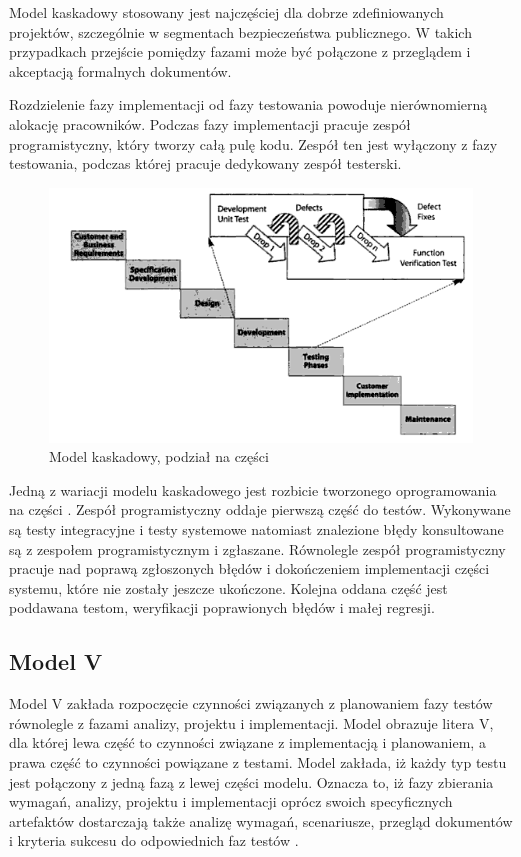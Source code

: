 Model kaskadowy stosowany jest najczęściej dla dobrze zdefiniowanych projektów, szczególnie w segmentach bezpieczeństwa publicznego. W takich przypadkach przejście pomiędzy fazami może być połączone z przeglądem i akceptacją formalnych dokumentów.

Rozdzielenie fazy implementacji od fazy testowania powoduje nierównomierną alokację pracowników. Podczas fazy implementacji pracuje zespół programistyczny, który tworzy całą pulę kodu. Zespół ten jest wyłączony z fazy testowania, podczas której pracuje dedykowany zespół testerski.
\begin{figure}[h]
\centerline{\includegraphics[scale=0.5]{img/water-wheel.png}}
\caption{Model kaskadowy, podział na części  \cite{TestingMatt}}
\label{fig:kaskadowyCzesci}
\end{figure}

Jedną z wariacji modelu kaskadowego jest rozbicie tworzonego oprogramowania na części \cite{TestingMatt}. 
Zespół programistyczny oddaje pierwszą część do testów. Wykonywane są testy integracyjne i testy systemowe natomiast znalezione błędy konsultowane są z zespołem programistycznym i zgłaszane. Równolegle zespół programistyczny pracuje nad poprawą zgłoszonych błędów i dokończeniem implementacji części systemu, które nie zostały jeszcze ukończone. Kolejna oddana część jest poddawana testom, weryfikacji poprawionych błędów i małej regresji.

\subsection{Model V}


Model V zakłada rozpoczęcie czynności związanych z planowaniem fazy testów równolegle z fazami analizy, projektu i implementacji. Model obrazuje litera V, dla której lewa część to czynności związane z implementacją i planowaniem, a prawa część to czynności powiązane z testami. Model zakłada, iż każdy typ testu jest połączony z jedną fazą z lewej części modelu. Oznacza to, iż fazy zbierania wymagań, analizy, projektu i implementacji oprócz swoich specyficznych artefaktów dostarczają także analizę wymagań, scenariusze, przegląd dokumentów i kryteria sukcesu do odpowiednich faz testów \cite{otss}.

